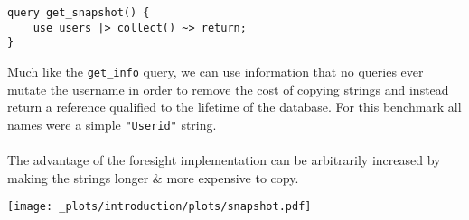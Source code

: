 \begin{verbatim}
query get_snapshot() {
    use users |> collect() ~> return;
}
\end{verbatim}
Much like the \texttt{get_info} query, we can use information that no queries ever mutate the username in order to remove the cost of copying strings and instead return a reference qualified to the lifetime of the database.
For this benchmark all names were a simple \texttt{"User{id}"} string.
\\
\\ The advantage of the foresight implementation can be arbitrarily increased by making the strings longer \& more expensive to copy.
\begin{center}
    \texttt{[image: \_plots/introduction/plots/snapshot.pdf]}
\end{center}

